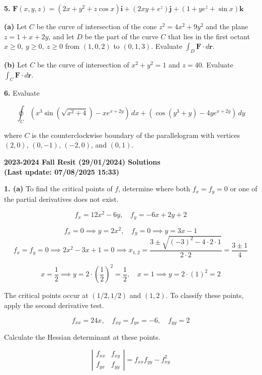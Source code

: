 \documentclass{article}
\begin{document}
\newpage

\textbf{5.} $\mathbf{F}(x,y,z)=\left(2x+y^2+z\cos x\right)\mathbf{i}+\left(2xy+{e}^z\right)\mathbf{j}+\left(1+y{e}^z+\sin x\right)\mathbf{k}$

\textbf{(a)} Let $C $ be the curve of intersection of the cone $z^2=4x^2+9y^2$ and the plane $z=1+x+2y$, and let $D$ be the part of the curve $C$ that lies in the first octant $x\geq0,\:y\geq0,\:z\geq0$ from $(1,0,2)$ to $(0,1,3)$. Evaluate $\int_D\mathbf{F}\cdot d\mathbf{r}$.

\textbf{(b)} Let $C$ be the curve of intersection of $x^2+y^2=1$ and $z=40$. Evaluate $\int_C\mathbf{F}\cdot d\mathbf{r}$.

\vspace{1em}

\textbf{6.} Evaluate

\[\oint_C\left(x^3\sin\left(\sqrt{x^2+4}\right)-x{e}^{x+2y}\right)\,dx + \left(\cos\left(y^3+y\right)-4y{e}^{x+2y}\right)\,dy\]

where $C$ is the counterclockwise boundary of the parallelogram with vertices $(2,0)$, $(0,-1)$, $(-2,0)$, and $(0,1)$.

\newpage

\begin{center}
\textbf{2023-2024 Fall Resit (29/01/2024) Solutions\\
(Last update: 07/08/2025 15:33)}
\end{center}

\textbf{1. (a)} To find the critical points of $f$, determine where both $f_x=f_y=0$ or one of the partial derivatives does not exist.

\[f_x=12x^2-6y,\quad f_y=-6x+2y+2\]

\[f_x=0\implies y=2x^2,\quad f_y=0\implies y=3x-1\]
\[f_x=f_y=0\implies 2x^2-3x+1=0\implies x_{1,2}=\frac{3\pm\sqrt{(-3)^2-4\cdot2\cdot 1}}{2\cdot2}=\frac{3\pm1}{4}\]

\[x=\frac12\implies y=2\cdot\left(\frac12\right)^2=\frac12,\quad x=1\implies y=2\cdot(1)^2=2\]

The critical points occur at $\left(1/2,1/2\right)$ and $(1,2)$. To classify these points, apply the second derivative test.

\[f_{xx}=24x,\quad f_{xy}=f_{yx}=-6,\quad f_{yy}=2\]

Calculate the Hessian determinant at these points.

\[\left|\begin{array}{cc}
f_{xx}&f_{xy}\\
f_{yx}&f_{yy}
\end{array}\right|=f_{xx}f_{yy}-f_{xy}^2\]
\end{document}
